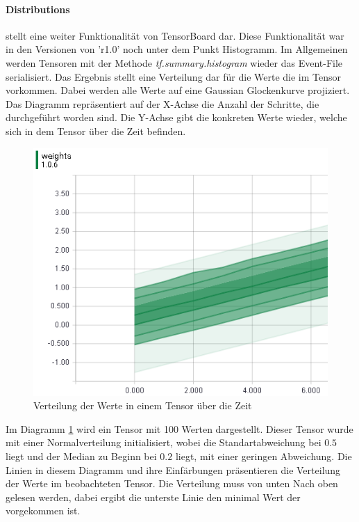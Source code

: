 \paragraph{Distributions} stellt eine weiter Funktionalität von TensorBoard dar.  %
Diese Funktionalität war in den Versionen von 'r1.0' noch unter dem Punkt Histogramm. 
Im Allgemeinen werden Tensoren mit der Methode \textit{tf.summary.histogram} wieder das Event-File serialisiert. 
Das Ergebnis stellt eine Verteilung dar für die Werte die im Tensor vorkommen. 
Dabei werden alle Werte auf eine Gaussian Glockenkurve projiziert. 
Das Diagramm repräsentiert auf der X-Achse die Anzahl der Schritte, die durchgeführt worden sind. 
Die Y-Achse gibt die konkreten Werte wieder, welche sich in dem Tensor über die Zeit befinden. 
\begin{figure}
	\centering
	\includegraphics[scale=0.8]{images/Distripution-small.png}
	\caption{Verteilung der Werte in einem Tensor über die Zeit}
	\label{fig:Verteilungsdiagram}
\end{figure}
Im Diagramm \ref{fig:Verteilungsdiagram} wird ein Tensor mit 100 Werten dargestellt. 
Dieser Tensor wurde mit einer Normalverteilung initialisiert, wobei die Standartabweichung bei $0.5$ liegt und der Median zu Beginn bei $0.2$ liegt, mit einer geringen Abweichung. 
Die Linien in diesem Diagramm und ihre Einfärbungen präsentieren die Verteilung der Werte im beobachteten Tensor. 
Die Verteilung muss von unten Nach oben gelesen werden, dabei ergibt die unterste Linie den minimal Wert der vorgekommen ist. 
